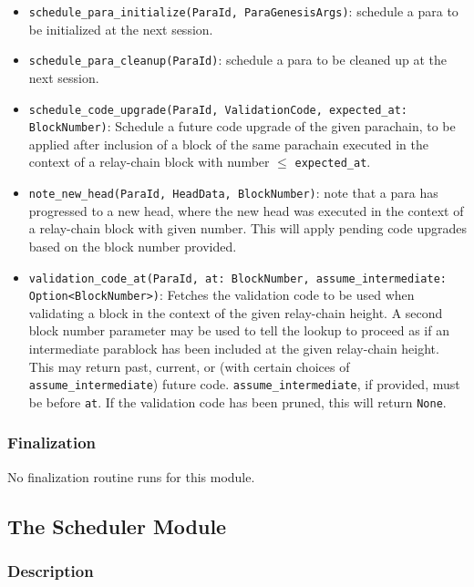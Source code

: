 \begin{itemize}
    \item \verb|schedule_para_initialize(ParaId, ParaGenesisArgs)|: schedule a
    para to be initialized at the next session.
    \item \verb|schedule_para_cleanup(ParaId)|: schedule a para to be cleaned up
    at the next session.
    \item \verb|schedule_code_upgrade(ParaId, ValidationCode, expected_at: BlockNumber)|:
    Schedule a future code upgrade of the given parachain, to be
    applied after inclusion of a block of the same parachain executed in the
    context of a relay-chain block with number $\leq$ \verb|expected_at|.
    \item \verb|note_new_head(ParaId, HeadData, BlockNumber)|: note that a para
    has progressed to a new head, where the new head was executed in the context
    of a relay-chain block with given number. This will apply pending code
    upgrades based on the block number provided.
    \item \verb|validation_code_at(ParaId, at: BlockNumber, assume_intermediate:|
    \newline
    \verb|Option<BlockNumber>)|:
    Fetches the validation code to be used when
    validating a block in the context of the given relay-chain height. A second
    block number parameter may be used to tell the lookup to proceed as if an
    intermediate parablock has been included at the given relay-chain height.
    This may return past, current, or (with certain choices of
    \verb|assume_intermediate|) future code. \verb|assume_intermediate|, if
    provided, must be before \verb|at|. If the validation code has been pruned,
    this will return \verb|None|.
\end{itemize}

\subsubsection{Finalization}

No finalization routine runs for this module.

\subsection{The Scheduler Module}

\subsubsection{Description}

